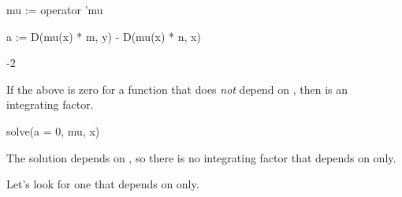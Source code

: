 {{{{{{{{{{{{{{{{\begin{xtc}
\begin{spadsrc}
mu := operator 'mu 
\end{spadsrc}
\begin{TeXOutput}
\begin{fricasmath}{4}
%
\end{fricasmath}
\end{TeXOutput}
\end{xtc}
\begin{xtc}
\begin{xtccomment}
\end{xtccomment}
\begin{spadsrc}
a := D(mu(x) * m, y) - D(mu(x) * n, x) 
\end{spadsrc}
\begin{TeXOutput}
\begin{fricasmath}{5}
\TIMES {}-{2\TIMES {}}%
\end{fricasmath}
\end{TeXOutput}
\end{xtc}
%
%
\begin{xtc}
\begin{xtccomment}
If the above is zero for a function
 that does {\it not} depend on , then
 is an integrating factor.
\end{xtccomment}
\begin{spadsrc}
solve(a = 0, mu, x) 
\end{spadsrc}
\begin{TeXOutput}
\begin{fricasmath}{6}
%
\end{fricasmath}
\end{TeXOutput}
\end{xtc}
%
The solution depends on , so there is no integrating
factor that depends on  only.
%
\begin{xtc}
\begin{xtccomment}
Let's look for one that depends on  only.
\end{xtccomment}

\end{xtc}}}}}}}}}}}}}}}}}
